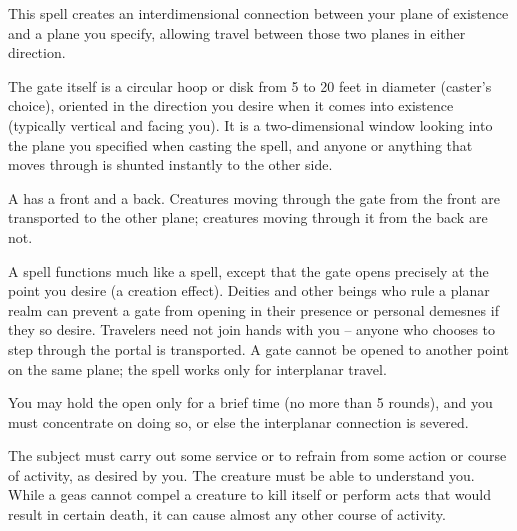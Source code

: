 \spelleffect This spell creates an interdimensional connection between your plane of existence and a plane you specify, allowing travel between those two planes in either direction.
\par The gate itself is a circular hoop or disk from 5 to 20 feet in diameter (caster's choice), oriented in the direction you desire when it comes into existence (typically vertical and facing you). It is a two-dimensional window looking into the plane you specified when casting the spell, and anyone or anything that moves through is shunted instantly to the other side.
\par A  has a front and a back. Creatures moving through the gate from the front are transported to the other plane; creatures moving through it from the back are not.
\par A  spell functions much like a  spell, except that the gate opens precisely at the point you desire (a creation effect). Deities and other beings who rule a planar realm can prevent a gate from opening in their presence or personal demesnes if they so desire. Travelers need not join hands with you -- anyone who chooses to step through the portal is transported. A gate cannot be opened to another point on the same plane; the spell works only for interplanar travel.
\par You may hold the  open only for a brief time (no more than 5 rounds), and you must concentrate on doing so, or else the interplanar connection is severed.

\spelleffect The subject must carry out some service or to refrain from some action or course of activity, as desired by you. The creature must be able to understand you. While a geas cannot compel a creature to kill itself or perform acts that would result in certain death, it can cause almost any other course of activity.

